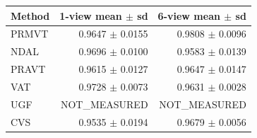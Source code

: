 \begin{tabular}{lrr}
\hline
Method & 1-view mean $\pm$ sd & 6-view mean $\pm$ sd \\
\hline
PRMVT & 0.9647 $\pm$ 0.0155 & 0.9808 $\pm$ 0.0096 \\
NDAL & 0.9696 $\pm$ 0.0100 & 0.9583 $\pm$ 0.0139 \\
PRAVT & 0.9615 $\pm$ 0.0127 & 0.9647 $\pm$ 0.0147 \\
VAT & 0.9728 $\pm$ 0.0073 & 0.9631 $\pm$ 0.0028 \\
UGF & NOT\_MEASURED & NOT\_MEASURED \\
CVS & 0.9535 $\pm$ 0.0194 & 0.9679 $\pm$ 0.0056 \\
\hline
\end{tabular}
